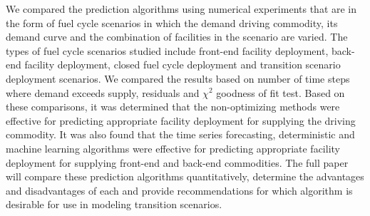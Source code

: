 \documentclass{anstrans}
\begin{document}
We compared the prediction algorithms using numerical experiments that are 
in the form of fuel cycle scenarios in which the
demand driving commodity, its demand curve and the combination of facilities 
in the scenario are varied. 
The types of fuel cycle scenarios studied include front-end facility deployment, 
back-end facility deployment, closed fuel cycle deployment and transition 
scenario deployment scenarios.
We compared the results based on number of time
steps where demand exceeds supply, residuals and $\chi^2$ goodness of fit test.
Based on these comparisons, it was determined that the non-optimizing methods
were effective for predicting 
appropriate facility deployment for supplying the driving commodity.  
It was also found that the time series forecasting, deterministic 
and machine learning 
algorithms were effective for predicting appropriate facility deployment for 
supplying front-end and back-end commodities. The full paper will compare 
these prediction algorithms quantitatively, determine the advantages and 
disadvantages of each and provide recommendations for which algorithm is 
desirable for use in modeling transition scenarios. 



\end{document}
